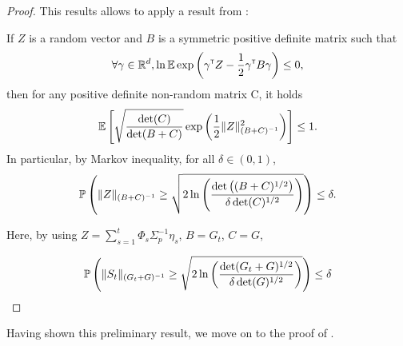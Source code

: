 \documentclass{article}
\begin{document}
\begin{proof}
This results allows to apply a result from \citep{pena2008self}:
\begin{lemma}
If $Z$ is a random vector and $B$ is a symmetric positive definite matrix such that
\[\forall \gamma\in\mathbb{R}^d, \ln \operatorname*{\mathbb{E}} \exp \left(\gamma^{\mathsf{\scriptscriptstyle T}} Z -\frac{1}{2} \gamma^{\mathsf{\scriptscriptstyle T}} B \gamma \right)\leq 0,\]
then for any positive definite non-random matrix C, it holds
\[\operatorname*{\mathbb{E}}\left[ \sqrt{\frac{\det(C)}{\det(B+C)} } \exp\left( \frac{1}{2}\|Z\|^2_{(B+C)^{-1}}\right)\right]\leq 1. \] 
In particular, by Markov inequality, for all $\delta\in(0,1)$, 
\[\mathbb{P}\left(\|Z\|_{(B+C)^{-1}} \geq \sqrt{2\ln \left(\frac{\det \left((B+C)^{1/2}\right)}{\delta\det(C)^{1/2}}\right)}\right)\leq \delta.\]
\end{lemma}

Here, by using $Z = \sum_{s=1}^t\Phi_s\Sigma_p^{-1}\eta_s$, $B=G_t$, $C=G$,

\[
\mathbb{P}\left(\| S_t \|_{(G_t+G)^{-1}} \geq \sqrt{2\ln \left(\frac{\det(G_t+G)^{1/2}}{\delta\det(G)^{1/2}}\right)}\right) \leq \delta
\]

\end{proof}

Having shown this preliminary result, we move on to the proof of .
\end{document}
